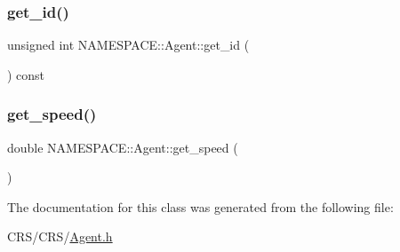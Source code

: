 \subsubsection{\texorpdfstring{get\+\_\+id()}{get\_id()}}
{\footnotesize\ttfamily unsigned int N\+A\+M\+E\+S\+P\+A\+C\+E\+::\+Agent\+::get\+\_\+id (\begin{DoxyParamCaption}{ }\end{DoxyParamCaption}) const}

\mbox{\label{class_n_a_m_e_s_p_a_c_e_1_1_agent_a604e52e3f48bd585218d8fc6277e4ce8}} 
\subsubsection{\texorpdfstring{get\+\_\+speed()}{get\_speed()}}
{\footnotesize\ttfamily double N\+A\+M\+E\+S\+P\+A\+C\+E\+::\+Agent\+::get\+\_\+speed (\begin{DoxyParamCaption}{ }\end{DoxyParamCaption})}



The documentation for this class was generated from the following file\+:\begin{DoxyCompactItemize}
\item 
C\+R\+S/\+C\+R\+S/\hyperlink{_agent_8h}{Agent.\+h}\end{DoxyCompactItemize}
